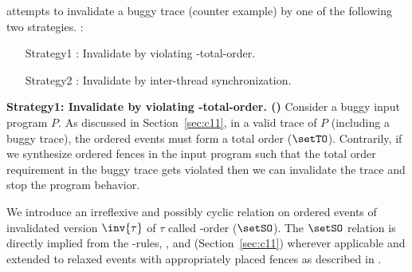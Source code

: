 \ourtechnique attempts to invalidate a buggy trace (\aka counter
example) by one of the following two strategies. :
\begin{itemize}[label=strategy1,align=left,leftmargin=*]
	\item [Strategy1]:
		Invalidate by violating \sc-total-order.
	\item [Strategy2]:
		Invalidate by inter-thread synchronization.
\end{itemize}

\noindent
{\bf Strategy1: Invalidate by violating \sc-total-order. 
	(\stfence)}\newline
Consider a buggy input program $P$.
%
As discussed in Section~\ref{sec:c11}, in a valid trace of $P$ 
(including a buggy trace), 
the \sc ordered events must form a total order ($\setTO$).
%
Contrarily, if we synthesize \sc ordered fences in the input program 
such that the total order requirement in the buggy trace gets violated 
then we can invalidate the trace and stop the program behavior.

We introduce an irreflexive and possibly cyclic relation
on \sc ordered events of invalidated version $\inv{\tau}$ of $\tau$ 
called \sc-order ($\setSO$).
%
The $\setSO$ relation is directly implied from
the \lto-rules, ,   
and  (Section~\ref{sec:c11}) wherever applicable
%
and extended to relaxed events with appropriately placed fences 
as described in \cc \cite{C11}\cite{Batty-POPL12}.


